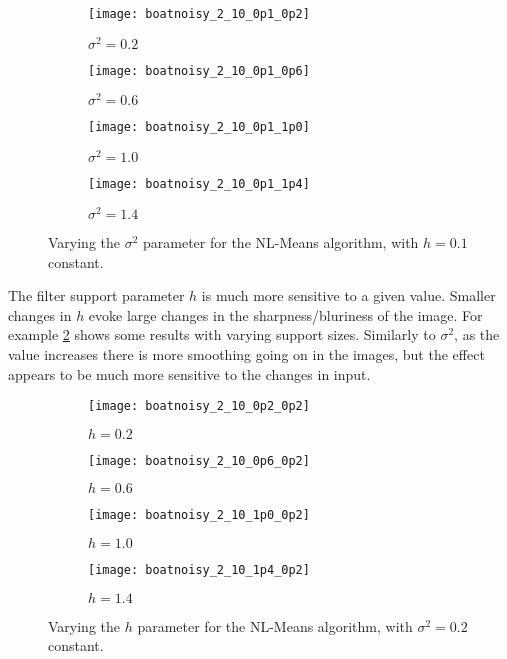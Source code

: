 \documentclass[11pt]{article}
\begin{document}
\begin{figure}
\centering
\graphicspath{{images/}}
\begin{subfigure}[b]{0.4\textwidth}
\centering
\texttt{[image: boatnoisy\_2\_10\_0p1\_0p2]}
\caption{$\sigma^2=0.2$}
\end{subfigure}
\begin{subfigure}[b]{0.4\textwidth}
\centering
\texttt{[image: boatnoisy\_2\_10\_0p1\_0p6]}
\caption{$\sigma^2=0.6$}
\end{subfigure}
\begin{subfigure}[b]{0.4\textwidth}
\centering
\texttt{[image: boatnoisy\_2\_10\_0p1\_1p0]}
\caption{$\sigma^2=1.0$}
\end{subfigure}
\begin{subfigure}[b]{0.4\textwidth}
\centering
\texttt{[image: boatnoisy\_2\_10\_0p1\_1p4]}
\caption{$\sigma^2=1.4$}
\end{subfigure}
\caption{Varying the $\sigma^2$ parameter for the NL-Means algorithm, with $h=0.1$ constant.}
\label{fig:boat:varsigma}
\end{figure}

The filter support parameter $h$ is much more sensitive to a given value.
Smaller changes in $h$ evoke large changes in the sharpness/bluriness of the image.
For example \ref{fig:boat:varh} shows some results with varying support sizes.
Similarly to $\sigma^2$, as the value increases there is more smoothing going on in the images, but the effect appears to be much more sensitive to the changes in input.

\begin{figure}
\centering
\graphicspath{{images/}}
\begin{subfigure}[b]{0.4\textwidth}
\centering
\texttt{[image: boatnoisy\_2\_10\_0p2\_0p2]}
\caption{$h=0.2$}
\end{subfigure}
\begin{subfigure}[b]{0.4\textwidth}
\centering
\texttt{[image: boatnoisy\_2\_10\_0p6\_0p2]}
\caption{$h=0.6$}
\end{subfigure}
\begin{subfigure}[b]{0.4\textwidth}
\centering
\texttt{[image: boatnoisy\_2\_10\_1p0\_0p2]}
\caption{$h=1.0$}
\end{subfigure}
\begin{subfigure}[b]{0.4\textwidth}
\centering
\texttt{[image: boatnoisy\_2\_10\_1p4\_0p2]}
\caption{$h=1.4$}
\end{subfigure}
\caption{Varying the $h$ parameter for the NL-Means algorithm, with $\sigma^2=0.2$ constant.}
\label{fig:boat:varh}
\end{figure}
\end{document}

